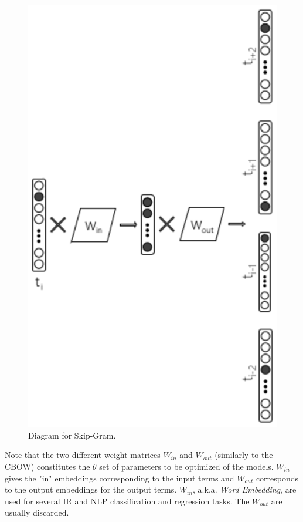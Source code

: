 \begin{figure}[t]
	\begin{center} 
    	\includegraphics[scale=0.99]{Figures/skip_gram.eps}
		\caption{Diagram for Skip-Gram.}
		\label{chap:word_embeddings:fig:skipgram_diagram}
	\end{center}
\end{figure}


Note that the two different weight matrices $W_{in}$ and $W_{out}$ (similarly to the CBOW) constitutes the $\theta$ set of parameters to be optimized of the models. $W_{in}$ gives the "in" embeddings corresponding to the input terms and $W_{out}$ corresponds to the output embeddings for the output terms. $W_{in}$, a.k.a. \textit{Word Embedding}, are used for several IR and NLP classification and regression tasks. The $W_{out}$ are usually discarded. 

